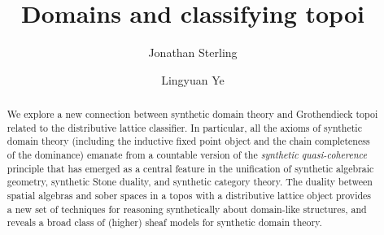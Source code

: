 \documentclass[a4paper,11pt]{amsart}
\title{Domains and classifying topoi}
\author{Jonathan Sterling}
\author{Lingyuan Ye}
\theoremstyle{definition}
\begin{document}
\begin{abstract}
  We explore a new connection between synthetic domain theory and Grothendieck topoi related to the distributive lattice classifier. In particular, all the axioms of synthetic domain theory (including the inductive fixed point object and the chain completeness of the dominance) emanate from a countable version of the \emph{synthetic quasi-coherence} principle that has emerged as a central feature in the unification of synthetic algebraic geometry, synthetic Stone duality, and synthetic category theory. The duality between spatial algebras and sober spaces in a topos with a distributive lattice object provides a new set of techniques for reasoning synthetically about domain-like structures, and reveals a broad class of (higher) sheaf models for synthetic domain theory. 
\end{abstract}

\maketitle
\tableofcontents




 

\end{document}
